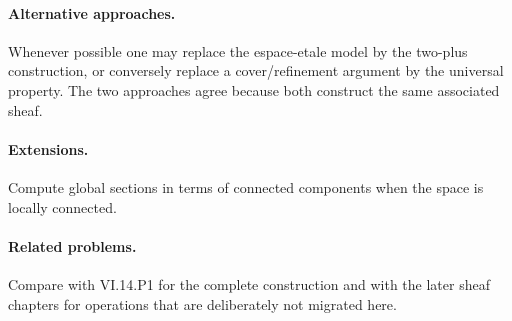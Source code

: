 \paragraph{Alternative approaches.}
Whenever possible one may replace the espace-etale model by the two-plus construction, or conversely replace a cover/refinement argument by the universal property.  The two approaches agree because both construct the same associated sheaf.

\paragraph{Extensions.}
Compute global sections in terms of connected components when the space is locally connected.

\paragraph{Related problems.}
Compare with VI.14.P1 for the complete construction and with the later sheaf chapters for operations that are deliberately not migrated here.
\fi
